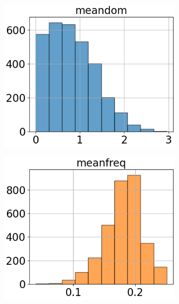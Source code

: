 \begin{figure}[htbp]
\begin{subfigure}[t]{.24\textwidth}
        \centering 
        \includegraphics[width=\linewidth]{../../python_code/plots/logistic_regression/histogram-meandom.png}
    \end{subfigure}
    \begin{subfigure}[t]{.24\textwidth}
        \centering 
        \includegraphics[width=\linewidth]{../../python_code/plots/logistic_regression/histogram-meanfreq.png}
    \end{subfigure}
    \begin{subfigure}[t]{.24\textwidth}

\end{subfigure}
\end{figure}
